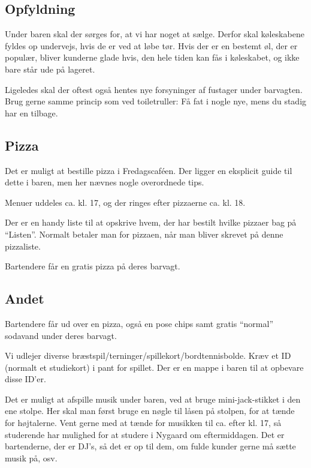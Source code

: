 \subsection{Opfyldning}
\label{sec:intra:opfyldning}

Under baren skal der sørges for, at vi har noget at sælge. Derfor skal
køleskabene fyldes op undervejs, hvis de er ved at løbe tør. Hvis der
er en bestemt øl, der er populær, bliver kunderne glade hvis, den hele
tiden kan fås i køleskabet, og ikke bare står ude på lageret.

Ligeledes skal der oftest også hentes nye forsyninger af fustager
under barvagten. Brug gerne samme princip som ved toiletruller: Få fat
i nogle nye, mens du stadig har en tilbage.

\subsection{Pizza}
\label{sec:intra:pizza}

Det er muligt at bestille pizza i Fredagscaféen. Der ligger en
eksplicit guide til dette i baren, men her nævnes nogle overordnede tips.

Menuer uddeles ca. kl. 17, og der ringes efter pizzaerne ca. kl. 18.

Der er en handy liste til at opskrive hvem, der har bestilt hvilke
pizzaer bag på ``Listen''. Normalt betaler man for pizzaen, når man
bliver skrevet på denne pizzaliste.

Bartendere får en gratis pizza på deres barvagt.

\subsection{Andet}
\label{sec:intra:andet}

Bartendere får ud over en pizza, også en pose chips samt gratis
``normal'' sodavand under deres barvagt.

Vi udlejer diverse
bræstspil/terninger/spillekort/bordtennisbolde. Kræv et ID (normalt et
studiekort) i pant for spillet. Der er en mappe i baren til at
opbevare disse ID'er.

Det er muligt at afspille musik under baren, ved at bruge
mini-jack-stikket i den ene stolpe. Her skal man først bruge en nøgle
til låsen på stolpen, for at tænde for højtalerne. Vent gerne med at
tænde for musikken til ca. efter kl. 17, så studerende har mulighed
for at studere i Nygaard om eftermiddagen. Det er bartenderne, der er
DJ's, så det er op til dem, om fulde kunder gerne må sætte musik på,
osv.


